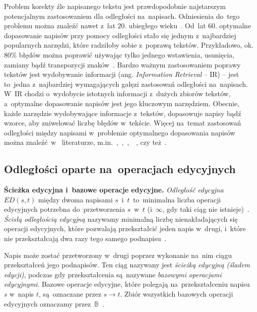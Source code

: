 \documentclass{praca1}
\begin{document}
Problem korekty źle napisanego tekstu jest prawdopodobnie najstarszym potencjalnym zastosowaniem dla odległości na~napisach. Odniesienia do~tego problemu można znaleźć nawet z~lat $20.$ ubiegłego wieku~\cite{Masters1927:spelling}. Od~lat $60.$ optymalne dopasowanie napisów przy pomocy odległości stało się jednym z~najbardziej popularnych narzędzi, które radziłoby sobie z~poprawą tekstów. Przykładowo, ok. $80\%$ błędów można poprawić używając tylko jednego wstawienia, usunięcia, zamiany bądź transpozycji znaków~\cite{Damerau1964:technique}. Bardzo ważnym zastosowaniem poprawy tekstów jest wydobywanie informacji (ang. \emph{Information Retrieval} -- IR) -- jest to~jedna z~najbardziej wymagających gałęzi zastosowań odległości na~napisach. W~IR chodzi o~wydobycie istotnych informacji z~dużych zbiorów tekstów, a~optymalne dopasowanie napisów jest jego kluczowym narzędziem. Obecnie, każde narzędzie wydobywające informacje z~tekstów, dopasowuje napisy bądź wzorce, aby zniwelować liczbę błędów w~tekście. Więcej na~temat zastosowań odległości między napisami w~problemie optymalnego dopasowania napisów można znaleźć~w~ literaturze, m.in.~\cite{Boytsov2011:indexingmethods},~\cite{Kukich1992:correcting},~\cite{Navarro2001:guidedtour},~\cite{Owolabi1988:fast}~\cite{Wagner1974:stringtostring}, czy też~\cite{Wagner1975:extensionstring}.

\subsection{Odległości oparte na~operacjach edycyjnych}

\textbf{Ścieżka edycyjna i~bazowe operacje edycyjne.} \emph{Odległość edycyjna} $ED(s,t)$ między dwoma napisami $s$~i~$t$~to~minimalna liczba operacji edycyjnych potrzebna do~przetworzenia $s$~w~$t$ (i~$\infty$, gdy taki ciąg nie istnieje)~\cite{Navarro2001:guidedtour}. \emph{Ścisłą odległością edycyjną} nazywamy minimalną liczbę nienakładających się operacji edycyjnych, które pozwalają przekształcić jeden napis w~drugi, i~które nie przekształcają dwa razy tego samego podnapisu~\cite{Boytsov2011:indexingmethods}.

Napis może zostać przetworzony w~drugi poprzez wykonanie na~nim ciągu przekształceń jego podnapisów. Ten ciąg nazywany jest \emph{ścieżką edycyjną (śladem edycji)}, podczas gdy przekształcenia są~nazywane \emph{bazowymi operacjami edycyjnymi}. Bazowe operacje edycyjne, które polegają na~przekształceniu napisu $s$ w~napis $t$, są~oznaczane przez $s \rightarrow t$. Zbiór wszystkich bazowych operacji edycyjnych oznaczamy przez~$\mathbb{B}$~\cite{Boytsov2011:indexingmethods}. 
\end{document}
